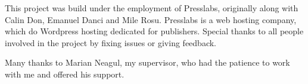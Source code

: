 \cleardoublepage

\begin{acknowledgements}

This project was build under the employment of Presslabs, originally along with Calin Don, Emanuel Danci and Mile Rosu. Presslabs is a web hosting company, which do Wordpress hosting dedicated for publishers. Special thanks to all people involved in the project by fixing issues or giving feedback.

Many thanks to Marian Neagul, my supervisor, who had the patience to work with me and offered his support.

\end{acknowledgements}
